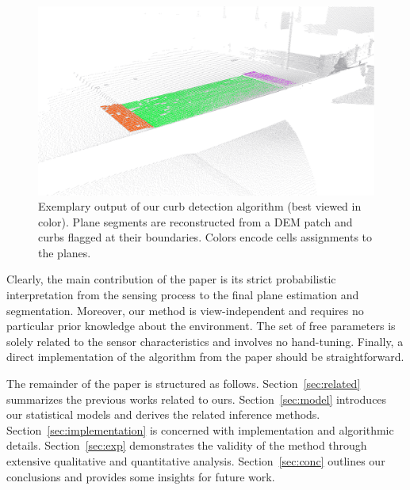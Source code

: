 \begin{figure}[t]
\centering
\includegraphics[width=\columnwidth]{fig/intro-curb.eps}
\caption{Exemplary output of our curb detection algorithm (best viewed in
color). Plane segments are reconstructed from a DEM patch and curbs flagged at
their boundaries. Colors encode cells assignments to the planes.}
\label{fig:intro}
\end{figure}

Clearly, the main contribution of the paper is its strict probabilistic
interpretation from the sensing process to the final plane estimation and
segmentation. Moreover, our method is view-independent and requires no
particular prior knowledge about the environment. The set of free parameters
is solely related to the sensor characteristics and involves no hand-tuning.
Finally, a direct implementation of the algorithm from the paper should be
straightforward.

The remainder of the paper is structured as follows. Section~\ref{sec:related}
summarizes the previous works related to ours. Section~\ref{sec:model}
introduces our statistical models and derives the related inference methods.
Section~\ref{sec:implementation} is concerned with implementation and
algorithmic details. Section~\ref{sec:exp} demonstrates the validity of the
method through extensive qualitative and quantitative analysis.
Section~\ref{sec:conc} outlines our conclusions and provides some insights for
future work.
